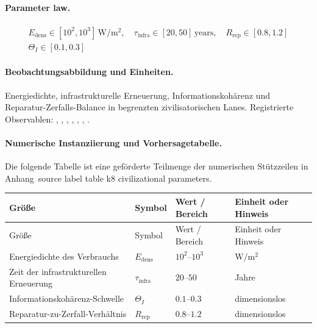 \paragraph{Parameter law.}
\[
\begin{gathered} E_{\mathrm{dens}} \in [10^2,10^3]\,\mathrm{W/m^2},\quad \tau_{\mathrm{infra}} \in [20,50]\,\mathrm{years},\quad R_{\mathrm{rep}} \in [0.8,1.2] \\ \Theta_I \in [0.1,0.3] \end{gathered}
\]

\paragraph{Beobachtungsabbildung und Einheiten.}
Energiedichte, infrastrukturelle Erneuerung, Informationskohärenz und Reparatur-Zerfalls-Balance in begrenzten zivilisatorischen Lanes.
Registrierte Observablen: , \allowbreak {}, \allowbreak {}, \allowbreak {}, \allowbreak {}, \allowbreak {}, \allowbreak {}.

\paragraph{Numerische Instanziierung und Vorhersagetabelle.}
Die folgende Tabelle ist eine geförderte Teilmenge der numerischen Stützzeilen in Anhang~source label table k8 civilizational parameters.
\begin{longtable}{@{}L{0.27\textwidth}L{0.15\textwidth}L{0.24\textwidth}L{0.16\textwidth}@{}}
\toprule
Größe & Symbol & Wert / Bereich & Einheit oder Hinweis \\
\midrule
\endfirsthead
\toprule
Größe & Symbol & Wert / Bereich & Einheit oder Hinweis \\
\midrule
\endhead
Energiedichte des Verbrauchs & $\scriptstyle E_{\mathrm{dens}}$ & $10^2\text{--}10^3$ & $\mathrm{W/m^2}$ \\
Zeit der infrastrukturellen Erneuerung & $\scriptstyle \tau_{\mathrm{infra}}$ & $20\text{--}50$ & Jahre \\
Informationskohärenz-Schwelle & $\scriptstyle \Theta_I$ & $0.1\text{--}0.3$ & dimensionslos \\
Reparatur-zu-Zerfall-Verhältnis & $\scriptstyle R_{\mathrm{rep}}$ & $0.8\text{--}1.2$ & dimensionslos \\
\bottomrule
\end{longtable}

